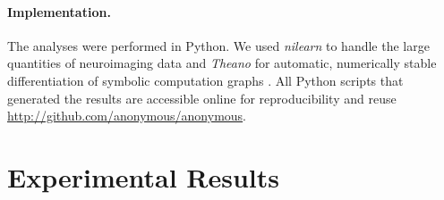 \documentclass{article} %
\begin{document}
\paragraph{Implementation.}
The analyses were performed in Python.
We used \textit{nilearn} to handle
the large quantities of neuroimaging data 
\cite{abrah14}
and
\textit{Theano} for automatic, numerically stable
differentiation of symbolic computation graphs
\cite{bastien2012theano, bergstra2010theano}.
All Python scripts that generated the results are
accessible online for reproducibility and reuse
\url{http://github.com/anonymous/anonymous}.

\section{Experimental Results}
\end{document}
